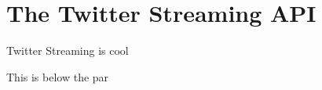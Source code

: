 \chapter{The Twitter Streaming API}

\label{chapter:Twitter Streaming}

Twitter Streaming is cool
\par
This is below the par
